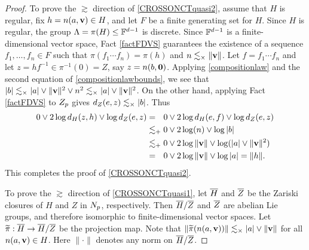 {\begin{proof}
To prove the $\gtrsim$ direction of \eqref{CROSSONCTquasi2}, assume that $H$ is regular, fix $h = n(a,\mathbf v)\in H$, and let $F$ be a finite generating set for $H$. Since $H$ is regular, the group $\Lambda = \pi(H) \leq \F^{d - 1}$ is discrete. Since $\F^{d - 1}$ is a finite-dimensional vector space, Fact \ref{factFDVS} guarantees the existence of a sequence $f_1,\ldots,f_n\in F$ such that $\pi(f_1\cdots f_n) = \pi(h)$ and $n \lesssim_\times \|\mathbf v\|$. Let $f = f_1\cdots f_n$ and let $z = hf^{-1} \in \pi^{-1}(0) = Z$, say $z = n(b,\mathbf 0)$. Applying \eqref{compositionlaw} and the second equation of \eqref{compositionlawbounds}, we see that $|b| \lesssim_\times |a| \vee \|\mathbf v\|^2 \vee n^2 \lesssim_\times |a| \vee \|\mathbf v\|^2$. On the other hand, applying Fact \ref{factFDVS} to $Z_p$ gives $d_Z(e,z) \lesssim_\times |b|$. Thus
\begin{align*}
0\vee 2\log\dist_H(z,h) \vee \log\dist_Z(e,z) &=_\pt 0\vee 2\log\dist_H(e,f) \vee \log\dist_Z(e,z)\\
&\lesssim_\plus 0\vee 2\log(n)\vee \log|b|\\
&\lesssim_\plus 0\vee 2\log\|\vv\| \vee \log(|a| \vee \|\vv\|^2)\\
&=_\pt 0\vee 2\log\|\vv\| \vee \log|a| = \dogo h.
\end{align*}
This completes the proof of \eqref{CROSSONCTquasi2}.

To prove the $\gtrsim$ direction of \eqref{CROSSONCTquasi1}, let $\overline H$ and $\overline Z$ be the Zariski closures of $H$ and $Z$ in $N_p$, respectively. Then $\overline H/\overline Z$ and $\overline Z$ are abelian Lie groups, and therefore isomorphic to finite-dimensional vector spaces. Let $\widetilde\pi:\overline H\to\overline H/\overline Z$ be the projection map. Note that $\|\widetilde\pi(n(a,\mathbf v))\| \lesssim_\times |a| \vee \|\mathbf v\|$ for all $n(a,\mathbf v)\in H$. Here $\|\cdot\|$ denotes any norm on $\overline H/\overline Z$.


\end{proof}}
